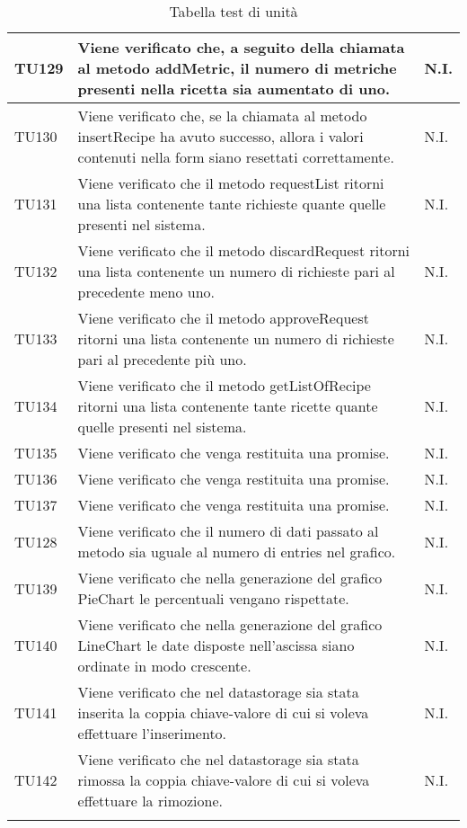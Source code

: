 \begin{center}
\begin{longtable}{| p{2cm} | p{8cm} | p{2.5cm} |}
					TU129 & Viene verificato che, a seguito della chiamata al metodo addMetric, il numero di metriche presenti nella ricetta sia aumentato di uno. & N.I.\\
					\hline
					TU130 & Viene verificato che, se la chiamata al metodo insertRecipe ha avuto successo, allora i valori contenuti nella form siano resettati correttamente. & N.I.\\
					\hline
					TU131 & Viene verificato che il metodo requestList ritorni una lista contenente tante richieste quante quelle presenti nel sistema. & N.I.\\
					\hline
					TU132 & Viene verificato che il metodo discardRequest ritorni una lista contenente un numero di richieste pari al precedente meno uno. & N.I.\\
					\hline
					TU133 & Viene verificato che il metodo approveRequest ritorni una lista contenente un numero di richieste pari al precedente più uno. & N.I.\\
					\hline
					TU134 & Viene verificato che il metodo getListOfRecipe ritorni una lista contenente tante ricette quante quelle presenti nel sistema. & N.I.\\
					\hline
					TU135 & Viene verificato che venga restituita una promise. & N.I.\\
					\hline
					TU136 & Viene verificato che venga restituita una promise. & N.I.\\
					\hline
					TU137 & Viene verificato che venga restituita una promise. & N.I.\\
					\hline
					TU128 & Viene verificato che il numero di dati passato al metodo sia uguale al numero di entries nel grafico. & N.I.\\
					\hline
					TU139 & Viene verificato che nella generazione del grafico PieChart le percentuali vengano rispettate. & N.I.\\
					\hline
					TU140 & Viene verificato che nella generazione del grafico LineChart le date disposte nell'ascissa siano ordinate in modo crescente. & N.I.\\
					\hline
					TU141 & Viene verificato che nel datastorage sia stata inserita la coppia chiave-valore di cui si voleva effettuare l'inserimento. & N.I.\\
					\hline
					TU142 & Viene verificato che nel datastorage sia stata rimossa la coppia chiave-valore di cui si voleva effettuare la rimozione. & N.I.\\
					\hline
					\caption{Tabella test di unità}
			\end{longtable}
			\egroup
			\end{center}
			
